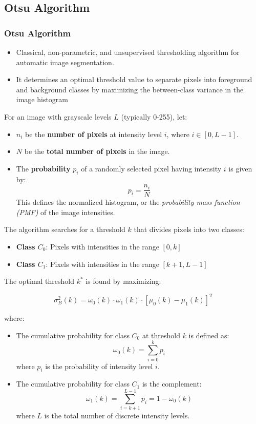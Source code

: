 \documentclass{beamer}
\begin{document}
\subsection{Otsu Algorithm}
\begin{frame}[allowframebreaks]
  \frametitle{Otsu Algorithm}
  \begin{itemize}
  \item Classical, non-parametric, and unsupervised thresholding
    algorithm for automatic image segmentation.
  \item It determines an optimal threshold value to separate pixels
    into foreground and background classes by maximizing the
    between-class variance in the image histogram
  \end{itemize}
For an image with grayscale levels \( L \) (typically 0-255), let:
\begin{itemize}
    \item $n_i$ be the \textbf{number of pixels} at intensity level $i$, where $i \in [0, L-1]$.
    \item  $N$ be the \textbf{total number of pixels} in the image.
    \item The \textbf{probability} $p_i$ of a randomly selected pixel having intensity $i$ is given by:
    \[
    p_i = \frac{n_i}{N}
    \]
    This defines the normalized histogram, or the \emph{probability mass function (PMF)} of the image intensities.
\end{itemize}

The algorithm searches for a threshold \( k \) that divides pixels into two classes:
\begin{itemize}
    \item \textbf{Class $C_0$}: Pixels with intensities in the range $[0, k]$
    \item \textbf{Class $C_1$}: Pixels with intensities in the range $[k+1, L-1]$
\end{itemize}

The optimal threshold \( k^* \) is found by maximizing:

\[
\sigma_B^2(k) = \omega_0(k) \cdot \omega_1(k) \cdot [\mu_0(k) - \mu_1(k)]^2
\]

where:
\begin{itemize}
    \item The cumulative probability for class $C_0$ at threshold $k$ is defined as:
    \[
    \omega_0(k) = \sum_{i=0}^{k} p_i
    \]
    where $p_i$ is the probability of intensity level $i$.

    \item The cumulative probability for class $C_1$ is the complement:
    \[
    \omega_1(k) = \sum_{i=k+1}^{L-1} p_i = 1 - \omega_0(k)
    \]
    where $L$ is the total number of discrete intensity levels.


\end{itemize}
\end{frame}
\end{document}
